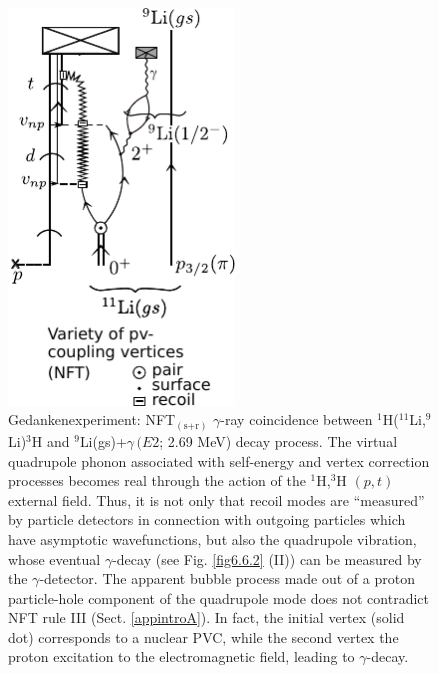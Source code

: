           \begin{figure}
          \centerline {
          \includegraphics*[width=6cm]{introduccion/figs/figintro6xxx}
          }
          \caption{ Gedankenexperiment: NFT$_{(\text{s+r})}$ $\gamma$-ray coincidence between  $^1$H($^{11}$Li,$^9$Li)$^3$H and $^9$Li(gs)+$\gamma\, (E2$; 2.69 MeV) decay process. The virtual quadrupole phonon associated with self-energy and vertex correction processes becomes real through the action of the $^1$H,$^3$H $(p,t)$ external field. Thus, it is not only that recoil modes are ``measured'' by particle  detectors in connection with outgoing particles which have  asymptotic wavefunctions, but also the quadrupole vibration, whose eventual $\gamma$-decay (see Fig. \ref{fig6.6.2} (II)) can be  measured by the $\gamma$-detector. The apparent bubble process made out of a proton particle-hole component of the quadrupole mode does not contradict NFT rule III (Sect. \ref{appintroA}). In fact, the initial vertex (solid dot) corresponds to a nuclear PVC, while the second vertex the proton excitation to the electromagnetic field, leading to  $\gamma$-decay. }
          \label{figintro6x}
          \end{figure}
